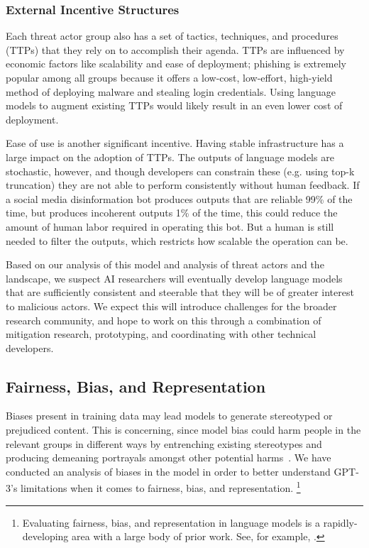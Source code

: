 \documentclass{article}
\begin{document}
        \subsubsection{External Incentive Structures}
        \label{section:External_Incentive_Structures}
Each threat actor group also has a set of tactics, techniques, and procedures (TTPs) that they rely on to accomplish their agenda. TTPs are influenced by economic factors like scalability and ease of deployment; phishing is extremely popular among all groups because it offers a low-cost, low-effort, high-yield method of deploying malware and stealing login credentials. Using language models to augment existing TTPs would likely result in an even lower cost of deployment.

Ease of use is another significant incentive. Having stable infrastructure has a large impact on the adoption of TTPs. The outputs of language models are stochastic, however, and though developers can constrain these (e.g. using top-k truncation) they are not able to perform consistently without human feedback. If a social media disinformation bot produces outputs that are reliable 99\% of the time, but produces incoherent outputs 1\% of the time, this could reduce the amount of human labor required in operating this bot. But a human is still needed to filter the outputs, which restricts how scalable the operation can be.

Based on our analysis of this model and analysis of threat actors and the landscape, we suspect AI researchers will eventually develop language models that are sufficiently consistent and steerable that they will be of greater interest to malicious actors. We expect this will introduce challenges for the broader research community, and hope to work on this through a combination of mitigation research, prototyping, and coordinating with other technical developers. 

    \subsection{Fairness, Bias, and Representation}
    \label{section:Fairness_Bias_and_Representation}
 Biases present in training data may lead models to generate stereotyped or prejudiced content. This is concerning, since model bias could harm people in the relevant groups in different ways by entrenching existing stereotypes and producing demeaning portrayals amongst other potential harms~\cite{youtube}. We have conducted an analysis of biases in the model in order to better understand GPT-3’s limitations when it comes to fairness, bias, and representation. \footnote{Evaluating fairness, bias, and representation in language models is a rapidly-developing area with a large body of prior work. See, for example, \cite{huang2019reducing, nadeem2020stereoset, sheng2019woman}.}
 
\end{document}
